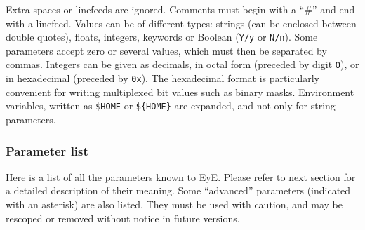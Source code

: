\documentclass[11pt,titlepage]{article}
\begin{document}
Extra spaces or linefeeds are ignored. Comments must begin with a ``\#''
and end with a linefeed. Values can be of different
types: strings (can be enclosed between double quotes), floats, integers, keywords or Boolean
({\tt Y/y} or {\tt N/n}). Some parameters accept zero or several values, which must then be separated by commas.
Integers can be given as decimals, in octal form (preceded by digit {\tt O}), or in hexadecimal (preceded by
{\tt 0x}). The hexadecimal format is particularly convenient for writing multiplexed bit values such as
binary masks. Environment variables, written as {\tt \$HOME} or {\tt \$\{HOME\}} are expanded, and not only
for string parameters.

\subsubsection{Parameter list}
Here is a list of all the parameters known to {\sc EyE}. Please refer
to next section for a detailed description of their meaning. Some ``advanced''
parameters (indicated with an asterisk) are also listed. They must be used with
caution, and may be rescoped or removed without notice in future versions.
\end{document}
